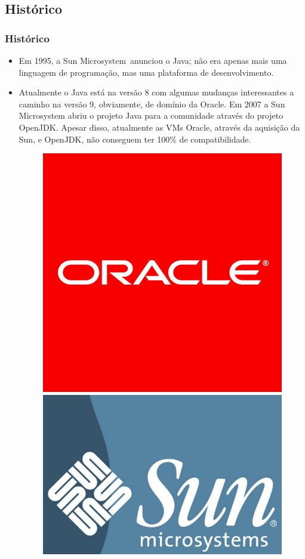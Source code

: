 \documentclass{beamer}
\begin{document}
\subsection{Histórico} %

\begin{frame}
\frametitle{Histórico}
\begin{itemize}
\item Em 1995, a Sun Microsystem\textregistered\ anunciou o Java; não era apenas mais uma linguagem de programação, mas uma plataforma de desenvolvimento.  
\item Atualmente o Java está na versão 8 com algumas mudanças interessantes a caminho na versão 9, obviamente, de domínio da Oracle. Em 2007 a Sun Microsystem abriu o projeto Java para a comunidade através do projeto OpenJDK. Apesar disso, atualmente as VMs Oracle\textregistered, através da aquisição da Sun, e OpenJDK, não conseguem ter 100\% de compatibilidade.
\\
	\begin{figure}[h!]
		\centering
		\includegraphics[scale=0.1]{imagens/oracle}
		\includegraphics[scale=0.1]{imagens/sun}
	\end{figure}
\end{itemize}
\end{frame}
\end{document}
